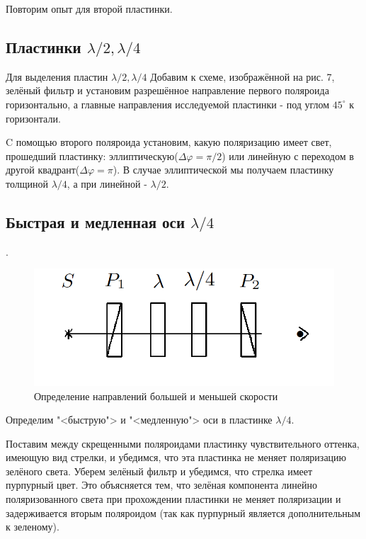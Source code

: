 \documentclass[a4paper, 12pt]{article}%
\begin{document}
	Повторим опыт для второй пластинки.
	
	\subsection{Пластинки $ \lambda/2, \lambda/4 $}
	
	Для выделения пластин $ \lambda/2, \lambda/4 $ Добавим к схеме, изображённой на рис. 7, зелёный фильтр и установим разрешённое направление первого поляроида горизонтально, а главные направления исследуемой пластинки - под углом $ 45^\circ $ к горизонтали.
	
	C помощью второго поляроида установим, какую поляризацию
	имеет свет, прошедший пластинку: эллиптическую($\Delta \varphi = \pi/2$) или линейную с переходом
	в другой квадрант($\Delta \varphi = \pi$). В случае эллиптической мы получаем пластинку толщиной $ \lambda/4 $, а при линейной - $ \lambda/2 $.
	
	\subsection{Быстрая и медленная оси $ \lambda/4 $}.
	
	\begin{figure}
		\includegraphics[width=\linewidth]{8}
		\caption{Определение направлений
			большей и меньшей скорости}
		\label{ris 8}
	\end{figure}
	
	Определим "<быструю"> и "<медленную"> оси в пластинке $ \lambda/4 $.
	
	Поставим между скрещенными поляроидами пластинку чувствительного оттенка, имеющую вид стрелки, и убедимся, что эта пластинка не меняет поляризацию зелёного света. Уберем зелёный фильтр и убедимся, что стрелка имеет пурпурный
	цвет. Это объясняется тем, что зелёная компонента линейно поляризованного света при прохождении пластинки не меняет поляризации и задерживается вторым поляроидом (так как пурпурный является дополнительным к зеленому).
	
\end{document}
